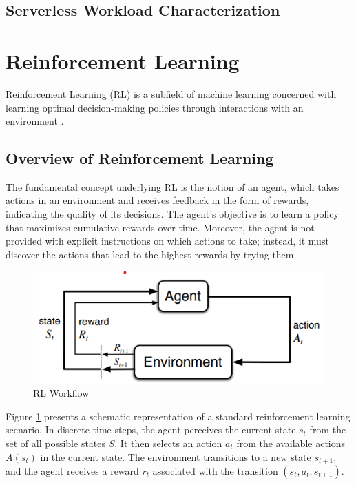 \subsection*{Serverless Workload Characterization}

\section{Reinforcement Learning}

Reinforcement Learning (RL) is a subfield of machine learning concerned with learning optimal decision-making policies through interactions with an environment \cite{sutton2018reinforcement}. 

\subsection{Overview of Reinforcement Learning}
The fundamental concept underlying RL is the notion of an agent, which takes actions in an environment and receives feedback in the form of rewards, indicating the quality of its decisions. The agent's objective is to learn a policy that maximizes cumulative rewards over time. Moreover, the agent is not provided with explicit instructions on which actions to take; instead, it must discover the actions that lead to the highest rewards by trying them.

\begin{figure}[ht]
    \centering
    \includegraphics[scale=1]{images/rl-workflow.png}
    \caption{RL Workflow}
    \label{fig:sutton_rl_workflow}
\end{figure}

Figure \ref{fig:sutton_rl_workflow} presents a schematic representation of a standard reinforcement learning scenario. In discrete time steps, the agent perceives the current state $s_t$ from the set of all possible states $S$. It then selects an action $a_t$ from the available actions $A(s_t)$ in the current state. The environment transitions to a new state $s_{t+1}$, and the agent receives a reward $r_t$ associated with the transition $(s_t, a_t, s_{t+1})$.

